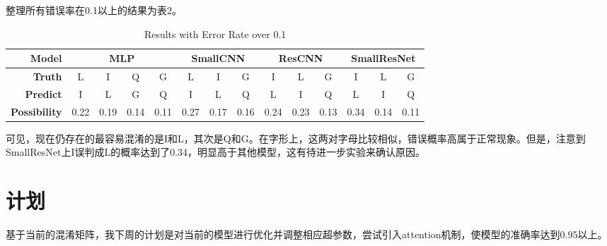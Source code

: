\documentclass{article}
\begin{document}
整理所有错误率在0.1以上的结果为表2。
\begin{table}[!ht]
    \centering
    \begin{tabular}{|r|c|c|c|c|c|c|c|c|c|c|c|c|c|}
    \hline
        \textbf{Model} & \multicolumn{4}{c|}{\textbf{MLP}} & \multicolumn{3}{c|}{\textbf{SmallCNN}} & \multicolumn{3}{c|}{\textbf{ResCNN}} & \multicolumn{3}{c|}{\textbf{SmallResNet}} \\ \hline
        \textbf{Truth} & L & I & Q & G & L & I & G & I & L & G & I & L & G \\ \hline
        \textbf{Predict} & I & L & G & Q & I & L & Q & L & I & Q & L & I & Q \\ \hline
        \textbf{Possibility} & 0.22 & 0.19 & 0.14 & 0.11 & 0.27 & 0.17 & 0.16 & 0.24 & 0.23 & 0.13 & 0.34 & 0.14 & 0.11 \\ \hline
    \end{tabular}
    \caption{Results with Error Rate over 0.1}
    \label{tab:results}
\end{table}

可见，现在仍存在的最容易混淆的是I和L，其次是Q和G。在字形上，这两对字母比较相似，错误概率高属于正常现象。但是，注意到SmallResNet上I误判成L的概率达到了0.34，明显高于其他模型，这有待进一步实验来确认原因。

\section{计划}

基于当前的混淆矩阵，我下周的计划是对当前的模型进行优化并调整相应超参数，尝试引入attention机制，使模型的准确率达到0.95以上。
\end{document}
